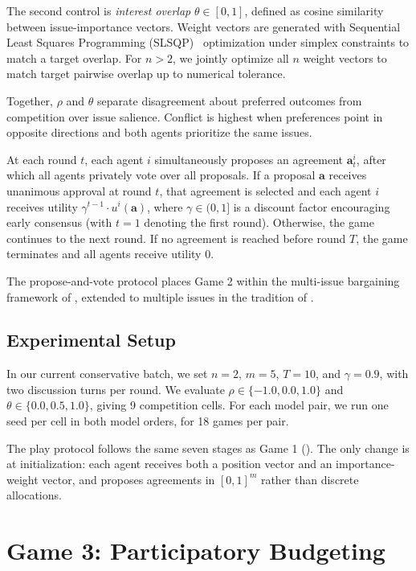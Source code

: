 The second control is \emph{interest overlap} $\theta \in [0,1]$, defined as cosine similarity between issue-importance vectors.
Weight vectors are generated with Sequential Least Squares Programming (SLSQP)~\citep{kraft1988slsqp} optimization under simplex constraints to match a target overlap.
For $n > 2$, we jointly optimize all $n$ weight vectors to match target pairwise overlap up to numerical tolerance.

Together, $\rho$ and $\theta$ separate disagreement about preferred outcomes from competition over issue salience.
Conflict is highest when preferences point in opposite directions and both agents prioritize the same issues.

At each round $t$, each agent $i$ simultaneously proposes an agreement $\bm{a}^{i}_{t}$, after which all agents privately vote over all proposals.
If a proposal $\bm{a}$ receives unanimous approval at round $t$, that agreement is selected and each agent $i$ receives utility $\gamma^{t-1} \cdot u^i(\bm{a})$, where $\gamma \in (0,1]$ is a discount factor encouraging early consensus (with $t=1$ denoting the first round).
Otherwise, the game continues to the next round.
If no agreement is reached before round $T$, the game terminates and all agents receive utility 0.

The propose-and-vote protocol places Game 2 within the multi-issue bargaining framework of \citet{rubinstein1982perfect}, extended to multiple issues in the tradition of \citet{fershtman1990importance}.

\subsection{Experimental Setup}
\label{sec:game_2_experimental_setup}

In our current conservative batch, we set $n = 2$, $m = 5$, $T = 10$, and $\gamma = 0.9$, with two discussion turns per round.
We evaluate $\rho \in \{-1.0, 0.0, 1.0\}$ and $\theta \in \{0.0, 0.5, 1.0\}$, giving 9 competition cells.
For each model pair, we run one seed per cell in both model orders, for 18 games per pair.

The play protocol follows the same seven stages as Game 1 ().
The only change is at initialization: each agent receives both a position vector and an importance-weight vector, and proposes agreements in $[0,1]^m$ rather than discrete allocations.

\section{Game 3: Participatory Budgeting}

